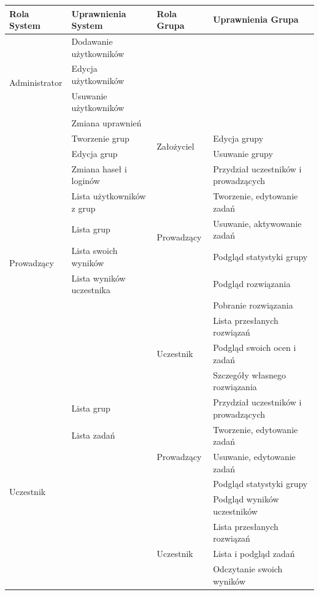 \documentclass[brudnopis]{xmgr}
\begin{document}
\begin{table}[!tbh]\footnotesize
\begin{tabular}{|l|l|l|l|}
\hline
Rola System & Uprawnienia System & Rola Grupa & Uprawnienia Grupa \\ 
\hline
\multirow{4}{*}{Administrator} & Dodawanie użytkowników & & \\
								& Edycja użytkowników & & \\
								& Usuwanie użytkowników & & \\  								
								& Zmiana uprawnień & & \\ 
\hline								 
\multirow{11}{*}{Prowadzący} & Tworzenie grup & \multirow{2}{*}{Założyciel} & Edycja grupy \\
							& Edycja grup 	  & 									& Usuwanie grupy \\ \cline{3-4}
							& Zmiana haseł i loginów & \multirow{6}{*}{Prowadzący}	 & Przydział uczestników i prowadzących \\
							& Lista użytkowników z grup & 							& Tworzenie, edytowanie zadań \\ 
							& Lista grup				&							& Usuwanie, aktywowanie zadań \\
							& Lista swoich wyników		& 							& Podgląd statystyki grupy \\
							& Lista wyników uczestnika &							& Podgląd rozwiązania \\
						   &							&							& Pobranie rozwiązania \\ \cline{3-4} 
						   &							& \multirow{3}{*}{Uczestnik} & Lista przesłanych rozwiązań \\
						   &						 	&							& Podgląd swoich ocen i zadań \\
						   &							&							& Szczegóły własnego rozwiązania \\ 
\hline
\multirow{8}{*}{Uczestnik} & Lista grup				& \multirow{5}{*}{Prowadzący} & Przydział uczestników i prowadzących \\
							& Lista zadań				&							& Tworzenie, edytowanie zadań \\
							&							&							& Usuwanie, edytowanie zadań \\
							&							&							& Podgląd statystyki grupy \\
							&							&							& Podgląd wyników uczestników \\ \cline{3-4}
							&							& \multirow{3}{*}{Uczestnik} & Lista przesłanych rozwiązań \\
							&							&							& Lista i podgląd zadań \\
							&							&							& Odczytanie swoich wyników \\
\hline	
\end{tabular}
\end{table}
\end{document}

